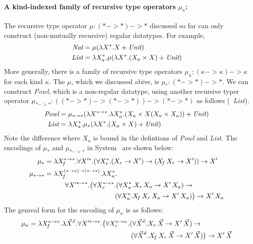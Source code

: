 \paragraph{A kind-indexed family of recursive type operators $\mu_\kappa$:}
The recursive type operator $\mu : (* -> *) -> *$ discussed so far can only
construct (non-mutually recursive) regular datatypes. For example,
\begin{align*}
\textit{Nat} &= \mu(\lambda X^{*}.X + \textit{Unit}) \\
\textit{List} &= \lambda X_a^{*}.\mu(\lambda X^{*}.(X_a\times X) + \textit{Unit})
\end{align*}
More generally, there is a family of recursive type operators
$\mu_\kappa : (\kappa -> \kappa) -> \kappa$ for each kind $\kappa$.
The $\mu$, which we discussed abive, is $\mu_{*} : (* -> *) -> *$.
We can construct \textit{Powl}, which is a non-regular datatype, using another
recursive typer operator $\mu_{* -> *} : ((*-> *) -> (*-> *)) -> (*-> *) $
as follows (\cf\ \textit{List}).
\begin{align*}
\textit{Powl} &= \mu_{* -> *}(\lambda X^{* -> *}.\lambda X_a^{*}.
                        (X_a\times X(X_a\times X_a)) + \textit{Unit}) \\
\textit{List} &= \lambda X_a^{*}.\mu_{*}(\lambda X^{*}.(X_a\times X) + \textit{Unit})
\end{align*}
Note the difference where $X_a$ is bound in the defintions of \textit{Powl}
and \textit{List}. The encodings of $\mu_{*}$ and $\mu_{*-> *}$ in System \Fw\ 
are shown below:
\begin{align*}
\mu_{*} &=
 \lambda X_{\!f}^{* -> *}.\forall X'^{*}.
 (\forall X_r^{*}.(X_r -> X') -> (X_{\!f}\,X_r -> X')) -> X' \\
\mu_{* -> *} &=
 \lambda X_{\!f}^{(*-> *) -> (*-> *)}.\lambda X_a^{*}.\\&\qquad\quad \forall X'^{*-> *}.
 \big(\forall X_r^{*-> *}.
        (\forall X_a^{*}.X_r\,X_a -> X'\,X_a) -> \\&\qquad\qquad\qquad\qquad\qquad~
        (\forall X_a^{*}.X_{\!f}\,X_r\,X_a -> X'\,X_a)\big) -> X'\,X_a
\end{align*}
The genreal form for the encoding of $\mu_\kappa$
is as follows:
\begin{align*}
\mu_{\kappa} &=
 \lambda X_{\!f}^{\kappa -> \kappa}.\lambda \vec{X}^{\vec{\kappa}}.
 \forall X'^{*-> *}.
 \big(\forall X_r^{\kappa -> \kappa}.
 (\forall \vec{X}^{\vec{\kappa}}.X_r\,\vec{X} -> X'\,\vec{X}) -> \\
 &\qquad\qquad\qquad\qquad\qquad\qquad\qquad\quad
 (\forall \vec{X}^{\vec{\kappa}}.X_{\!f}\,X_r\,\vec{X} -> X'\,\vec{X})
 \big) -> X'\,\vec{X}
\end{align*}
